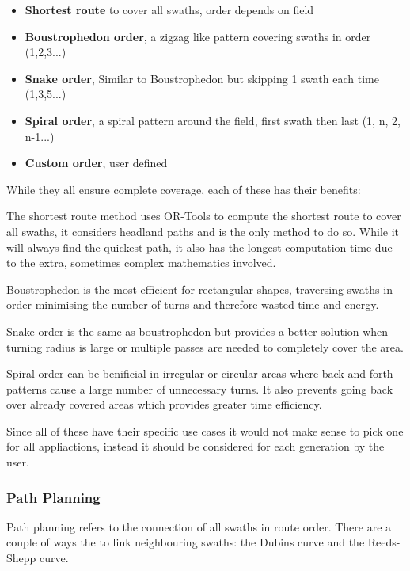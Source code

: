 \documentclass[final]{cmpreport_02}
\begin{document}
\begin{itemize}
	\item{\textbf{Shortest route} to cover all swaths, order depends on field}
	\item{\textbf{Boustrophedon order}, a zigzag like pattern covering swaths in order (1,2,3...)}
	\item{\textbf{Snake order}, Similar to Boustrophedon but skipping 1 swath each time (1,3,5...)}
    \item{\textbf{Spiral order}, a spiral pattern around the field, first swath then last (1, n, 2, n-1...)}
	\item{\textbf{Custom order}, user defined}
\end{itemize}
While they all ensure complete coverage, each of these has their benefits:

The shortest route method uses OR-Tools \citep{ortools} to compute the shortest route to cover all swaths, it considers headland paths and is the only method to do so.
While it will always find the quickest path, it also has the longest computation time due to the extra, sometimes complex mathematics involved.

Boustrophedon is the most efficient for rectangular shapes, traversing swaths in order minimising the number of turns and therefore wasted time and energy.

Snake order is the same as boustrophedon but provides a better solution when turning radius is large or multiple passes are needed to completely cover the area.


Spiral order can be benificial in irregular or circular areas where back and forth patterns cause a large number of unnecessary turns.
It also prevents going back over already covered areas which provides greater time efficiency.

Since all of these have their specific use cases it would not make sense to pick one for all appliactions, instead it should be considered for each generation by the user.

\subsubsection{Path Planning}
Path planning refers to the connection of all swaths in route order.
There are a couple of ways the to link neighbouring swaths: the Dubins curve and the Reeds-Shepp curve.

\end{document}
